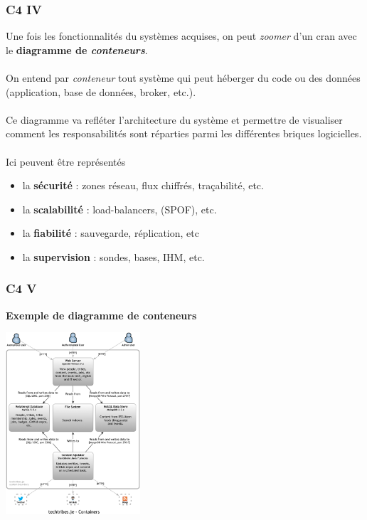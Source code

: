 \begin{frame}
	\frametitle{C4 IV}
    
    Une fois les fonctionnalit\'{e}s du syst\`{e}mes acquises, on peut \textit{zoomer} d'un cran avec le \textbf{diagramme de \textit{conteneurs}}.
    \\~\\
    On entend par \textit{conteneur} tout syst\`{e}me qui peut h\'{e}berger du code ou des donn\'{e}es (application, base de donn\'{e}es, broker, etc.).
    \\~\\
    Ce diagramme va refl\'{e}ter l'architecture du syst\`{e}me et permettre de visualiser comment les responsabilit\'{e}s sont r\'{e}parties parmi les diff\'{e}rentes briques logicielles.
    \\~\\
    Ici peuvent \^{e}tre repr\'{e}sent\'{e}s
    \begin{itemize}
    	\item la \textbf{s\'{e}curit\'{e}} : zones r\'{e}seau, flux chiffr\'{e}s, tra\c{c}abilit\'{e}, etc.
        \item la \textbf{scalabilit\'{e}} : load-balancers, (SPOF), etc.
        \item la \textbf{fiabilit\'{e}} : sauvegarde, r\'{e}plication, etc
        \item la \textbf{supervision} : sondes, bases, IHM, etc.
    \end{itemize}
\end{frame}

\begin{frame}
	\frametitle{C4 V}

    \textbf{Exemple de diagramme de conteneurs}\\
    \centerline{\includegraphics[width=5cm]{img/container_diagram.png}}
\end{frame}

